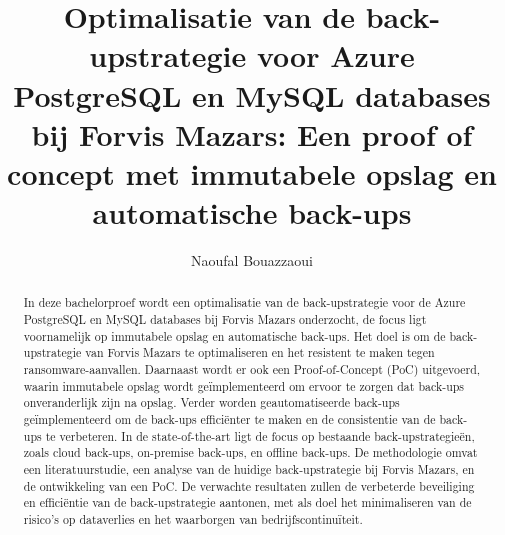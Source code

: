 \documentclass{hogent-article}
\title{Optimalisatie van de back-upstrategie voor Azure PostgreSQL en MySQL databases bij Forvis Mazars: Een proof of concept met immutabele opslag en automatische back-ups}
\author{Naoufal Bouazzaoui}
\begin{document}
\begin{abstract}
In deze bachelorproef wordt een optimalisatie van de back-upstrategie voor de Azure PostgreSQL en MySQL databases bij Forvis Mazars onderzocht, de focus ligt voornamelijk op immutabele opslag en automatische back-ups. Het doel is om de back-upstrategie van Forvis Mazars te optimaliseren en het resistent te maken tegen ransomware-aanvallen. Daarnaast wordt er ook een Proof-of-Concept (PoC) uitgevoerd, waarin immutabele opslag wordt geïmplementeerd om ervoor te zorgen dat back-ups onveranderlijk zijn na opslag. Verder worden geautomatiseerde back-ups geïmplementeerd om de back-ups efficiënter te maken en de consistentie van de back-ups te verbeteren. In de state-of-the-art ligt de focus op bestaande back-upstrategieën, zoals cloud back-ups, on-premise back-ups, en offline back-ups.   De methodologie omvat een literatuurstudie, een analyse van de huidige back-upstrategie bij Forvis Mazars, en de ontwikkeling van een PoC. De verwachte resultaten zullen de verbeterde beveiliging en efficiëntie van de back-upstrategie aantonen, met als doel het minimaliseren van de risico's op dataverlies en het waarborgen van bedrijfscontinuïteit.
\end{abstract}

\tableofcontents



\printbibliography[heading=bibintoc]
\end{document}
